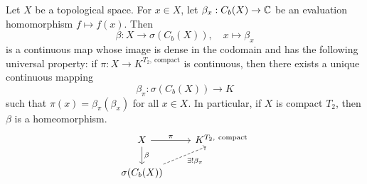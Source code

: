 \begin{theorem}
  Let $X$ be a topological space. For $x \in X$, let $\beta_x: C_b (X) \to \mathbb {C}$
  be an evaluation homomorphism $f \mapsto f(x)$. Then 
  $$\beta: X \to \sigma (C_b (X)),\quad x \mapsto \beta_x$$
  is a continuous map whose image is dense in the codomain and has the following universal property:
  if $\pi: X \to K^{T_2,\ \textrm{compact}}$ is continuous, then there exists a unique continuous mapping  
  $$\beta_{\pi} : \sigma (C_b (X)) \to K$$
  such that $\pi(x) = \beta_{\pi} (\beta_x)$ for all $x \in X$.
  In particular, if $X$ is compact $T_2$, then $\beta$ is a homeomorphism.
  \[\begin{tikzcd}
    X & {K^{T_2,\ \textrm{compact}}} \\
    {\sigma(C_b(X))}
    \arrow["\beta", from=1-1, to=2-1]
    \arrow["\pi", from=1-1, to=1-2]
    \arrow["{\exists! \beta_{\pi}}"', dashed, from=2-1, to=1-2]
  \end{tikzcd}\]
\end{theorem}

